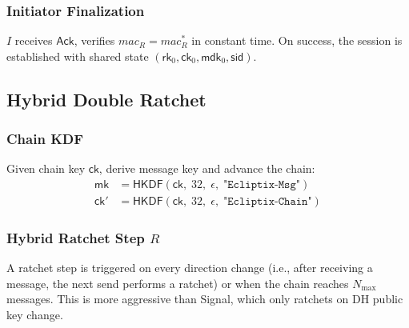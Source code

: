 \documentclass[11pt,a4paper]{article}
\theoremstyle{definition}
\theoremstyle{remark}
\newcommand{\HKDF}{\mathsf{HKDF}}
\newcommand{\rk}{\mathsf{rk}}
\newcommand{\ck}{\mathsf{ck}}
\newcommand{\mk}{\mathsf{mk}}
\newcommand{\mdk}{\mathsf{mdk}}
\newcommand{\sid}{\mathsf{sid}}
\begin{document}
\subsubsection{Initiator Finalization}

$I$ receives $\mathsf{Ack}$, verifies $\mathit{mac}_R = \mathit{mac}_R^{*}$
in constant time.  On success, the session is established with shared state
$(\rk_0, \ck_0, \mdk_0, \sid)$.

\subsection{Hybrid Double Ratchet}
\label{subsec:ratchet}

\subsubsection{Chain KDF}

Given chain key $\ck$, derive message key and advance the chain:
\begin{align*}
  \mk &= \HKDF(\ck,\; 32,\; \epsilon,\; \texttt{"Ecliptix-Msg"}) \\
  \ck' &= \HKDF(\ck,\; 32,\; \epsilon,\; \texttt{"Ecliptix-Chain"})
\end{align*}

\subsubsection{Hybrid Ratchet Step $R$}
\label{subsubsec:ratchet-step}

A ratchet step is triggered on every direction change (i.e., after receiving a
message, the next send performs a ratchet) or when the chain reaches
$N_{\max}$ messages.  This is more aggressive than Signal, which only ratchets
on DH public key change.
\end{document}
